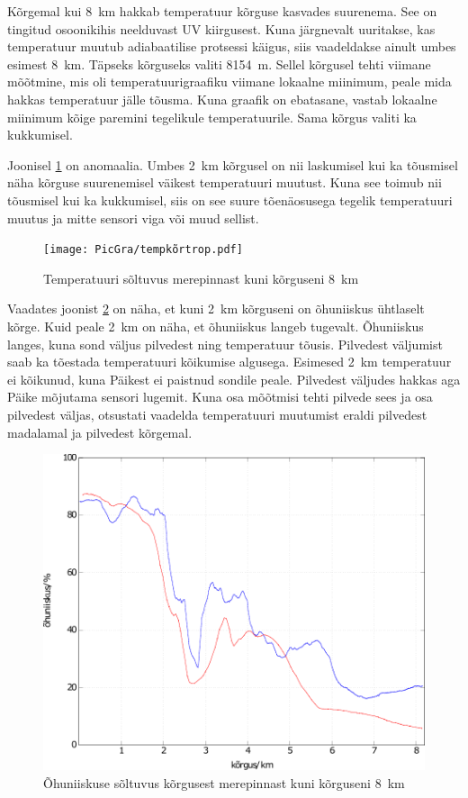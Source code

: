 \documentclass{trkut}%
\begin{document}
Kõrgemal kui \SI{8}{km} hakkab temperatuur kõrguse kasvades suurenema. See on tingitud osoonikihis neelduvast UV kiirgusest. Kuna järgnevalt uuritakse, kas temperatuur muutub adiabaatilise protsessi käigus, siis vaadeldakse ainult umbes esimest \SI{8}{km}. Täpseks kõrguseks valiti \SI{8154}{m}. Sellel kõrgusel tehti viimane mõõtmine, mis oli temperatuurigraafiku viimane lokaalne miinimum, peale mida hakkas temperatuur jälle tõusma. Kuna graafik on ebatasane, vastab lokaalne miinimum kõige paremini tegelikule temperatuurile. Sama kõrgus valiti ka kukkumisel.

Joonisel \ref{tempkõrtrop} on anomaalia. Umbes \SI{2}{km} kõrgusel on nii laskumisel kui ka tõusmisel näha kõrguse suurenemisel väikest temperatuuri muutust. Kuna see toimub nii tõusmisel kui ka kukkumisel, siis on see suure tõenäosusega tegelik temperatuuri muutus ja mitte sensori viga või muud sellist.
\begin{figure}[h]
	\texttt{[image: PicGra/tempkõrtrop.pdf]}
	\caption{Temperatuuri sõltuvus merepinnast kuni kõrguseni \SI{8}{km}}
	\label{tempkõrtrop}%
\end{figure}

Vaadates joonist \ref{humkõrtrop} on näha, et kuni \SI{2}{km} kõrguseni on õhuniiskus ühtlaselt kõrge. Kuid peale \SI{2}{km} on näha, et õhuniiskus langeb tugevalt. Õhuniiskus langes, kuna sond väljus pilvedest ning temperatuur tõusis. Pilvedest väljumist saab ka tõestada temperatuuri kõikumise algusega. Esimesed \SI{2}{km} temperatuur ei kõikunud, kuna Päikest ei paistnud sondile peale. Pilvedest väljudes hakkas aga Päike mõjutama sensori lugemit. Kuna osa mõõtmisi tehti pilvede sees ja osa pilvedest väljas, otsustati vaadelda temperatuuri muutumist eraldi pilvedest madalamal ja pilvedest kõrgemal.
\begin{figure}[h]
	\includegraphics[width=1\textwidth]{PicGra/humkõrtrop.pdf}
	\caption{Õhuniiskuse sõltuvus kõrgusest merepinnast kuni kõrguseni \SI{8}{km}}
	\label{humkõrtrop}%
\end{figure}
\end{document}
